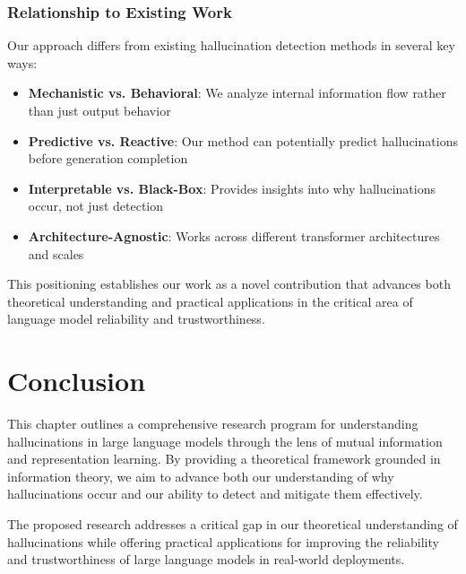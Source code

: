 \subsubsection{Relationship to Existing Work}
Our approach differs from existing hallucination detection methods in several key ways:
\begin{itemize}
    \item \textbf{Mechanistic vs. Behavioral}: We analyze internal information flow rather than just output behavior
    \item \textbf{Predictive vs. Reactive}: Our method can potentially predict hallucinations before generation completion
    \item \textbf{Interpretable vs. Black-Box}: Provides insights into why hallucinations occur, not just detection
    \item \textbf{Architecture-Agnostic}: Works across different transformer architectures and scales
\end{itemize}

This positioning establishes our work as a novel contribution that advances both theoretical understanding and practical applications in the critical area of language model reliability and trustworthiness.

\section{Conclusion}
\label{sec:hall_conclusion}

This chapter outlines a comprehensive research program for understanding hallucinations in large language models through the lens of mutual information and representation learning. By providing a theoretical framework grounded in information theory, we aim to advance both our understanding of why hallucinations occur and our ability to detect and mitigate them effectively.

The proposed research addresses a critical gap in our theoretical understanding of hallucinations while offering practical applications for improving the reliability and trustworthiness of large language models in real-world deployments.
